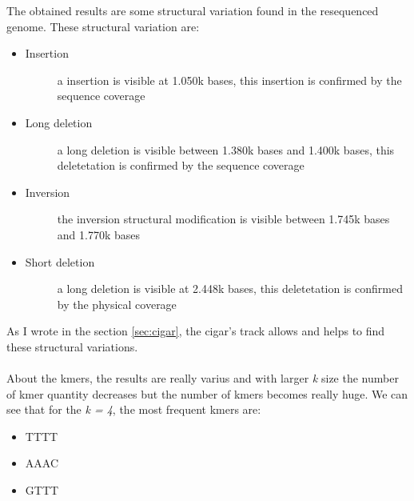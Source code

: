 The obtained results are some structural variation found in the resequenced genome.
These structural variation are:
\begin{itemize}

\item \begin{description}
		\item[Insertion] a insertion is visible at 1.050k bases, this insertion is confirmed by the sequence coverage
  \end{description}
\item \begin{description}
		\item[Long deletion] a long deletion is visible between 1.380k bases and 1.400k bases, this deletetation is confirmed by the sequence coverage
  \end{description}
\end{itemize}
\begin{itemize}
\item \begin{description}
		\item[Inversion] the inversion structural modification is visible between 1.745k bases and 1.770k bases
  \end{description}
\end{itemize}
\begin{itemize}
\item \begin{description}
		\item[Short deletion] a long deletion is visible at 2.448k bases, this deletetation is confirmed by the physical coverage
  \end{description}
\end{itemize}



As I wrote in the section \ref{sec:cigar}, the cigar's track allows and helps to find these structural variations.\\\\

About the kmers, the results are really varius and with larger \emph{k} size the number of kmer quantity decreases but the number of kmers becomes really huge.
We can see that for the \emph{k = 4}, the most frequent kmers are: 
\begin{itemize}
\item TTTT
\item AAAC
\item GTTT
\end{itemize}

